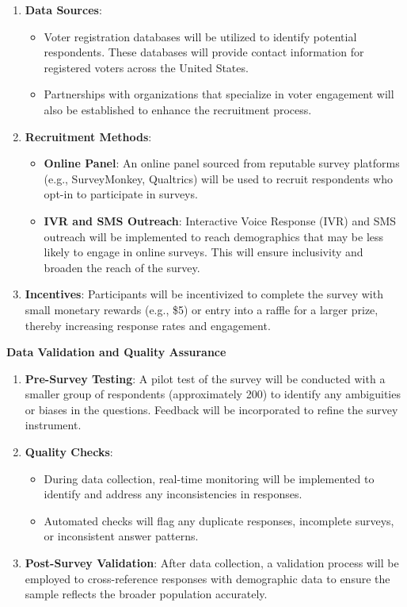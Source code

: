 \documentclass[
  letterpaper,
  DIV=11,
  numbers=noendperiod]{scrartcl}
\begin{document}
\begin{enumerate}
\def\labelenumi{\arabic{enumi}.}
\item
  \textbf{Data Sources}:

  \begin{itemize}
  \item
    Voter registration databases will be utilized to identify potential
    respondents. These databases will provide contact information for
    registered voters across the United States.
  \item
    Partnerships with organizations that specialize in voter engagement
    will also be established to enhance the recruitment process.
  \end{itemize}
\item
  \textbf{Recruitment Methods}:

  \begin{itemize}
  \item
    \textbf{Online Panel}: An online panel sourced from reputable survey
    platforms (e.g., SurveyMonkey, Qualtrics) will be used to recruit
    respondents who opt-in to participate in surveys.
  \item
    \textbf{IVR and SMS Outreach}: Interactive Voice Response (IVR) and
    SMS outreach will be implemented to reach demographics that may be
    less likely to engage in online surveys. This will ensure
    inclusivity and broaden the reach of the survey.
  \end{itemize}
\item
  \textbf{Incentives}: Participants will be incentivized to complete the
  survey with small monetary rewards (e.g., \$5) or entry into a raffle
  for a larger prize, thereby increasing response rates and engagement.
\end{enumerate}

\textbf{Data Validation and Quality Assurance}

\begin{enumerate}
\def\labelenumi{\arabic{enumi}.}
\item
  \textbf{Pre-Survey Testing}: A pilot test of the survey will be
  conducted with a smaller group of respondents (approximately 200) to
  identify any ambiguities or biases in the questions. Feedback will be
  incorporated to refine the survey instrument.
\item
  \textbf{Quality Checks}:

  \begin{itemize}
  \item
    During data collection, real-time monitoring will be implemented to
    identify and address any inconsistencies in responses.
  \item
    Automated checks will flag any duplicate responses, incomplete
    surveys, or inconsistent answer patterns.
  \end{itemize}
\item
  \textbf{Post-Survey Validation}: After data collection, a validation
  process will be employed to cross-reference responses with demographic
  data to ensure the sample reflects the broader population accurately.
\end{enumerate}
\end{document}
